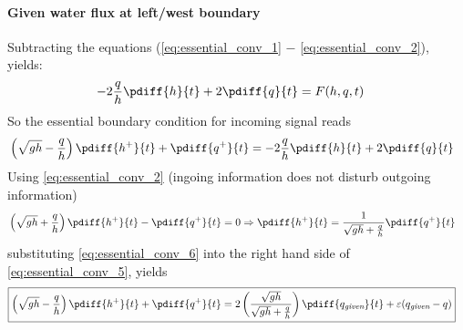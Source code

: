 \paragraph*{Given water flux at left/west boundary}
Subtracting the equations (\eqref{eq:essential_conv_1} $-$ \eqref{eq:essential_conv_2}), yields:
\begin{align}
    - 2 \frac{q}{h}\pdiff{h}{t}  + 2 \pdiff{q}{t} & =  F(h, q, t)
\end{align}
So the essential boundary condition for incoming signal reads
\begin{align}
    & \left(\sqrt{gh} - \frac{q}{h}\right) \pdiff{h^{+}}{t} + \pdiff{q^{+}}{t} =
    - 2 \frac{q}{h}\pdiff{h}{t}  + 2 \pdiff{q}{t} \label{eq:essential_conv_5}
\end{align}
Using \autoref{eq:essential_conv_2} (ingoing information does not disturb outgoing information)
\begin{align}
    &\left(\sqrt{gh} + \frac{q}{h}\right) \pdiff{h^{+}}{t} - \pdiff{q^{+}}{t} = 0
    \Rightarrow
    \pdiff{h^{+}}{t}   =
    \frac{1}{\sqrt{gh} + \frac{q}{h}}\pdiff{q^{+}}{t}\label{eq:essential_conv_6}
\end{align}
substituting \autoref{eq:essential_conv_6} into the right hand side of \autoref{eq:essential_conv_5}, yields
\begin{align}
    &{\boxed{
            \left(\sqrt{gh} - \frac{q}{h}\right) \pdiff{h^{+}}{t} + \pdiff{q^{+}}{t} =
            2 \left( \frac{\sqrt{gh}}{\sqrt{gh} + \frac{q}{h}} \right)\pdiff{q_{\textit{given}}}{t} + \eps(q_{\textit{given}} - q)
    }}\label{eq:essential_bc_q}
\end{align}
